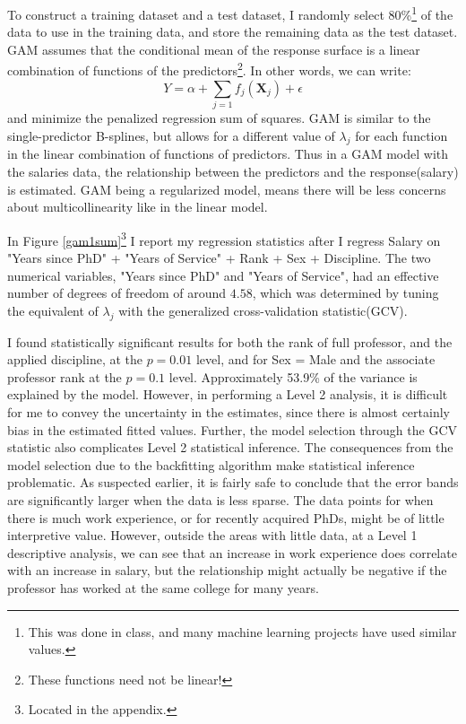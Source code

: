 \documentclass{article}
\begin{document}
To construct a training dataset and a test dataset, I randomly select 80\%\footnote{This was done in class, and many machine learning projects have used similar values.} of the data to use in the training data, and store the remaining data as the test dataset. GAM assumes that the conditional mean of the response surface is a linear combination of functions of the predictors\footnote{These functions need not be linear!}. In other words, we can write: 
\begin{equation}
    Y = \alpha + \sum_{j=1}f_j (\textbf{X}_j) + \epsilon
\end{equation}
and minimize the penalized regression sum of squares. GAM is similar to the single-predictor B-splines, but allows for a different value of $\lambda_j$ for each function in the linear combination of functions of predictors. Thus in a GAM model with the salaries data, the relationship between the predictors and the response(salary) is estimated. GAM being a regularized model, means there will be less concerns about multicollinearity like in the linear model. 

In Figure \ref{gam1sum}\footnote{Located in the appendix.} I report my regression statistics after I regress Salary on "Years since PhD" + "Years of Service" + Rank + Sex + Discipline. The two numerical variables, "Years since PhD" and "Years of Service", had an effective number of degrees of freedom of around $4.58$, which was determined by tuning the equivalent of $\lambda_j$ with the generalized cross-validation statistic(GCV). 

I found statistically significant results for both the rank of full professor, and the applied discipline, at the $p=0.01$ level, and for Sex = Male and the associate professor rank at the $p=0.1$ level. Approximately 53.9\% of the variance is explained by the model. However, in performing a Level 2 analysis, it is difficult for me to convey the uncertainty in the estimates, since there is almost certainly bias in the estimated fitted values. Further, the model selection through the GCV statistic also complicates Level 2 statistical inference. The consequences from the model selection due to the backfitting algorithm make statistical inference problematic. As suspected earlier, it is fairly safe to conclude that the error bands are significantly larger when the data is less sparse. The data points for when there is much work experience, or for recently acquired PhDs, might be of little interpretive value. However, outside the areas with little data, at a Level 1 descriptive analysis, we can see that an increase in work experience does correlate with an increase in salary, but the relationship might actually be negative if the professor has worked at the same college for many years. 
\end{document}
